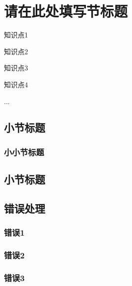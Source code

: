 \section{请在此处填写节标题}\label{sec:节标题}

\begin{Abstract}
    \item 知识点1
    \item 知识点2
    \item 知识点3
    \item 知识点4
    \item ...
\end{Abstract}


\subsection{小节标题}\label{subsec:节标题-小节标题}

\subsubsection{小小节标题}

\subsection{小节标题}\label{subsec:节标题-小节标题}


\subsection{错误处理}\label{subsec:节标题-错误处理}

\subsubsection{错误1}

\subsubsection{错误2}

\subsubsection{错误3}